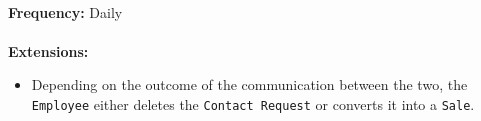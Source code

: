 \HRule \\[0.4cm]
\textbf{Frequency:}
Daily \\
\HRule \\[0.4cm]
\textbf{Extensions:}
\begin{itemize}
	\item Depending on the outcome of the communication between the two, the \texttt{Employee} either deletes the \texttt{Contact Request} or converts it into a \texttt{Sale}.
\end{itemize}
\HRule \\[0.4cm]
